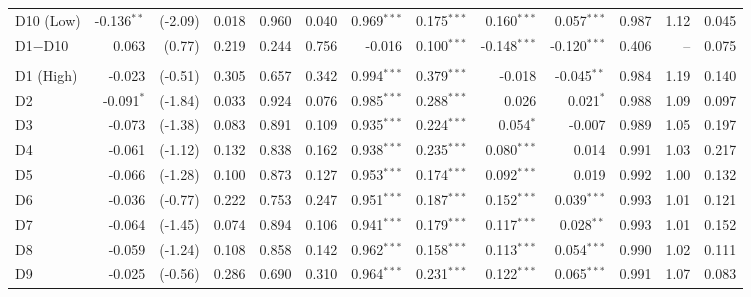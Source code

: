 \begin{table}[!htbp]
{\begin{tabular}{lrrrrrrrrrrrr}
\hspace{1em}D10 (Low) & -0.136$^{**}$ & (-2.09) & 0.018 & 0.960 & 0.040 & 0.969$^{***}$ & 0.175$^{***}$ & 0.160$^{***}$ & 0.057$^{***}$ & 0.987 & 1.12 & 0.045\\
\hspace{1em}D1$-$D10 & 0.063 & (0.77) & 0.219 & 0.244 & 0.756 & -0.016 & 0.100$^{***}$ & -0.148$^{***}$ & -0.120$^{***}$ & 0.406 & -- & 0.075\\
\addlinespace[0.3em]
\hline
\multicolumn{13}{l}{\textit{Panel B: Full sample, raw-alpha ranking (robustness)}}\\
\hspace{1em}D1 (High) & -0.023 & (-0.51) & 0.305 & 0.657 & 0.342 & 0.994$^{***}$ & 0.379$^{***}$ & -0.018 & -0.045$^{**}$ & 0.984 & 1.19 & 0.140\\
\hspace{1em}D2 & -0.091$^{*}$ & (-1.84) & 0.033 & 0.924 & 0.076 & 0.985$^{***}$ & 0.288$^{***}$ & 0.026 & 0.021$^{*}$ & 0.988 & 1.09 & 0.097\\
\hspace{1em}D3 & -0.073 & (-1.38) & 0.083 & 0.891 & 0.109 & 0.935$^{***}$ & 0.224$^{***}$ & 0.054$^{*}$ & -0.007 & 0.989 & 1.05 & 0.197\\
\hspace{1em}D4 & -0.061 & (-1.12) & 0.132 & 0.838 & 0.162 & 0.938$^{***}$ & 0.235$^{***}$ & 0.080$^{***}$ & 0.014 & 0.991 & 1.03 & 0.217\\
\hspace{1em}D5 & -0.066 & (-1.28) & 0.100 & 0.873 & 0.127 & 0.953$^{***}$ & 0.174$^{***}$ & 0.092$^{***}$ & 0.019 & 0.992 & 1.00 & 0.132\\
\hspace{1em}D6 & -0.036 & (-0.77) & 0.222 & 0.753 & 0.247 & 0.951$^{***}$ & 0.187$^{***}$ & 0.152$^{***}$ & 0.039$^{***}$ & 0.993 & 1.01 & 0.121\\
\hspace{1em}D7 & -0.064 & (-1.45) & 0.074 & 0.894 & 0.106 & 0.941$^{***}$ & 0.179$^{***}$ & 0.117$^{***}$ & 0.028$^{**}$ & 0.993 & 1.01 & 0.152\\
\hspace{1em}D8 & -0.059 & (-1.24) & 0.108 & 0.858 & 0.142 & 0.962$^{***}$ & 0.158$^{***}$ & 0.113$^{***}$ & 0.054$^{***}$ & 0.990 & 1.02 & 0.111\\
\hspace{1em}D9 & -0.025 & (-0.56) & 0.286 & 0.690 & 0.310 & 0.964$^{***}$ & 0.231$^{***}$ & 0.122$^{***}$ & 0.065$^{***}$ & 0.991 & 1.07 & 0.083\\

\end{tabular}}
\end{table}

